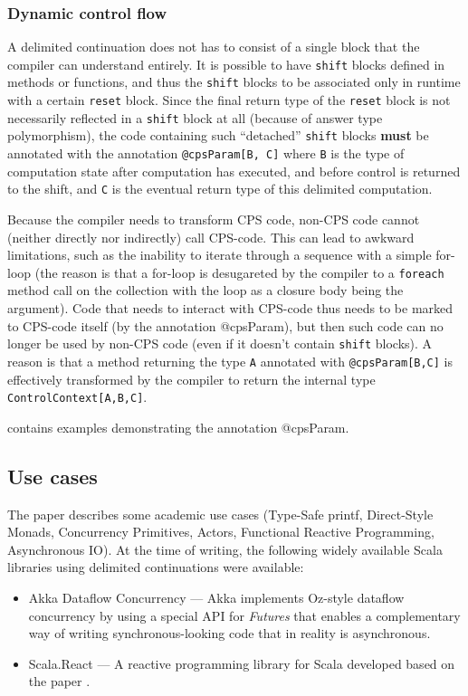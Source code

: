 \subsubsection{Dynamic control flow}

A delimited continuation does not has to consist of a single block that the compiler can understand entirely. It is possible to have \texttt{shift} blocks defined in methods or functions, and thus the \texttt{shift} blocks to be associated only in runtime with a certain \texttt{reset} block. Since the final return type of the \texttt{reset} block is not necessarily reflected in a \texttt{shift} block at all (because of answer type polymorphism), the code containing such ``detached'' \texttt{shift} blocks \textbf{must} be annotated with the annotation \texttt{@cpsParam[B, C]} where \texttt{B} is the type of computation state after computation has executed, and before control is returned to the shift, and \texttt{C} is the eventual return type of this delimited computation. 

Because the compiler needs to transform CPS code, non-CPS code cannot (neither directly nor indirectly) call CPS-code. This can lead to awkward limitations, such as the inability to iterate through a sequence with a simple for-loop (the reason is that a for-loop is desugareted by the compiler to a \texttt{foreach} method call on the collection with the loop as a closure body being the argument). Code that needs to interact with CPS-code thus needs to be marked to CPS-code itself (by the annotation @cpsParam), but then such code can no longer be used by non-CPS code (even if it doesn't contain \texttt{shift} blocks). A reason is that a method returning the type \texttt{A} annotated with \texttt{@cpsParam[B,C]} is effectively transformed by the compiler to return the internal type \texttt{ControlContext[A,B,C]}. 

 contains examples demonstrating the annotation @cpsParam.

\subsection{Use cases}

The paper \cite{CPSTransform} describes some academic use cases (Type-Safe printf, Direct-Style Monads, Concurrency Primitives, Actors, Functional Reactive Programming, Asynchronous IO). At the time of writing, the following widely available Scala libraries using delimited continuations were available:
\begin{itemize}
\item Akka Dataflow Concurrency --- Akka implements Oz-style dataflow concurrency by using a special API for \emph{Futures} that enables a complementary way of writing synchronous-looking code that in reality is asynchronous. \cite{AkkaDataflow}
\item Scala.React --- A reactive programming library for Scala developed based on the paper \cite{DeprecatingObservers}.

\end{itemize}

